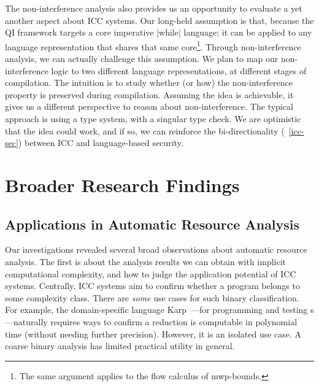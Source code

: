 The non-interference analysis also provides us an opportunity to evaluate a yet another aspect about ICC systems.
Our long-held assumption is that, because the QI framework targets a core imperative \pr|while| language;
it can be applied to any language representation that shares that same core\footnote{The same argument applies to the flow calculus of mwp-bounds.}.
Through non-interference analysis, we can actually challenge this assumption.
We plan to map our non-interference logic to two different language representations, at different stages of compilation.
The intuition is to study whether (or how) the non-interference property is preserved during compilation.
Assuming the idea is achievable, it gives us a different perspective to reason about non-interference.
The typical approach is using a type system, with a singular type check.
We are optimistic that the idea could work, and if so,
we can reinforce the bi-directionality (\cf~\autoref{icc-sec}) between ICC and language-based security.


\section{Broader Research Findings}
\label{sec:broader-findings}

\subsection{Applications in Automatic Resource Analysis}
\label{subsec:res-resource-analysis}

Our investigations revealed several broad observations about automatic resource analysis.
The first is about the analysis results we can obtain with implicit computational complexity, and how to judge the application potential of ICC systems.
Centrally, ICC systems aim to confirm whether a program belongs to some complexity class.
There are \emph{some} use cases for such binary classification.
For example, the domain-specific language Karp~\cite{zhang2022}---for programming and testing s---naturally requires ways to confirm a reduction is computable in polynomial time (without needing further precision).
However, it is an isolated use case.
A coarse binary analysis has limited practical utility in general.

